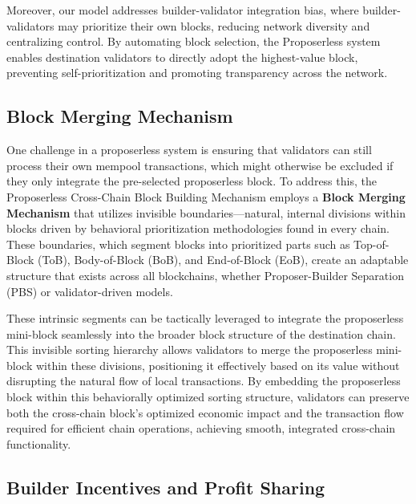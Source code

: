 \documentclass{article}
\begin{document}
Moreover, our model addresses builder-validator integration bias, where builder-validators may prioritize their own blocks, reducing network diversity and centralizing control. By automating block selection, the Proposerless system enables destination validators to directly adopt the highest-value block, preventing self-prioritization and promoting transparency across the network.

\subsection{Block Merging Mechanism}

One challenge in a proposerless system is ensuring that validators can still process their own mempool transactions, which might otherwise be excluded if they only integrate the pre-selected proposerless block. To address this, the Proposerless Cross-Chain Block Building Mechanism employs a \textbf{Block Merging Mechanism} that utilizes invisible boundaries---natural, internal divisions within blocks driven by behavioral prioritization methodologies found in every chain. These boundaries, which segment blocks into prioritized parts such as Top-of-Block (ToB), Body-of-Block (BoB), and End-of-Block (EoB), create an adaptable structure that exists across all blockchains, whether Proposer-Builder Separation (PBS) or validator-driven models.

These intrinsic segments can be tactically leveraged to integrate the proposerless mini-block seamlessly into the broader block structure of the destination chain. This invisible sorting hierarchy allows validators to merge the proposerless mini-block within these divisions, positioning it effectively based on its value without disrupting the natural flow of local transactions. By embedding the proposerless block within this behaviorally optimized sorting structure, validators can preserve both the cross-chain block's optimized economic impact and the transaction flow required for efficient chain operations, achieving smooth, integrated cross-chain functionality.

\subsection{Builder Incentives and Profit Sharing}
\end{document}
